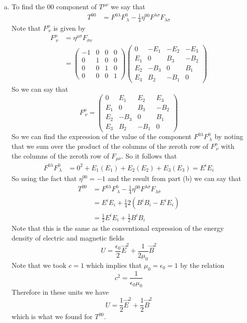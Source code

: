 \documentclass[11pt]{article}
\numberwithin{equation}{section}
\begin{document}
\begin{enumerate}[(a)]
\item
To find the $00$ component of $T^{\mu\nu}$ we say that
\begin{align*}
T^{00} &= F^{0\lambda}F^{0}_{\ \lambda} - \frac{1}{4}\eta^{00}F^{\lambda\sigma}F_{\lambda\sigma}
\end{align*}
Note that $F^{\mu}_{\ \nu}$ is given by
\begin{align*}
F^{\mu}_{\ \nu} &= \eta^{\mu\sigma}F_{\sigma\nu} \\
&= \left(\begin{array}{cccc}
		-1 &0 &0 &0\\
		0 &1 &0 &0\\
		0 &0 &1 &0\\
		0 &0 &0 &1
		\end{array}\right)
		\left(\begin{array}{cccc}
		0 &-E_1 &-E_2 &-E_3\\
		E_1 &0 &B_3 &-B_2\\
		E_2 &-B_3 &0 &B_1\\
		E_3 &B_2 &-B_1 &0
		\end{array}\right)
\end{align*}
So we can say that
$$F^{\mu}_{\ \nu} = 		\left(\begin{array}{cccc}
		0 &E_1 &E_2 &E_3\\
		E_1 &0 &B_3 &-B_2\\
		E_2 &-B_3 &0 &B_1\\
		E_3 &B_2 &-B_1 &0
		\end{array}\right)$$
So we can find the expression of the value of the component $F^{0\lambda}F^{0}_{\ \lambda}$ by noting that we sum over the product of the columns of the zeroth row of $F^{\mu}_{\ \nu}$ with the columns of the zeroth row of $F_{\mu\nu}$. So it follows that
\begin{align*}
F^{0\lambda}F^{0}_{\ \lambda} &= 0^2 + E_1(E_1)+ E_2(E_2)+ E_3(E_3) = E^iE_i
\end{align*}
So using the fact that $\eta^{00} = -1$ and the result from part (b) we can say that
\begin{align*}
T^{00} &= F^{0\lambda}F^{0}_{\ \lambda} - \frac{1}{4}\eta^{00}F^{\lambda\sigma}F_{\lambda\sigma}\\
&= E^iE_i + \frac{1}{4}2\left(B^iB_i-E^iE_i\right)\\
&= \frac{1}{2}E^iE_i + \frac{1}{2}B^iB_i
\end{align*}
Note that this is the same as the conventional expression of the energy density of electric and magnetic fields
$$U = \frac{\epsilon_0}{2}\vec{E}^2 + \frac{1}{2\mu_0}\vec{B}^2$$
Note that we took $c=1$ which implies that $\mu_0=\epsilon_0=1$ by the relation
$$c^2 = \frac{1}{\epsilon_0\mu_0}$$
Therefore in these units we have
$$U = \frac{1}{2}\vec{E}^2 + \frac{1}{2}\vec{B}^2$$
which is what we found for $T^{00}$.


\end{enumerate}
\end{document}
